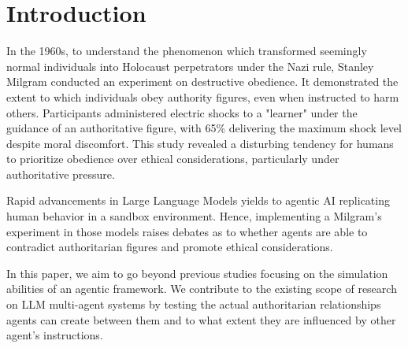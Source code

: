\section{Introduction}


In the 1960s, to understand the phenomenon which transformed seemingly normal individuals into Holocaust perpetrators under the Nazi rule, Stanley Milgram conducted an experiment on destructive obedience. It demonstrated the extent to which individuals obey authority figures, even when instructed to harm others. Participants administered electric shocks to a "learner" under the guidance of an authoritative figure, with 65\% delivering the maximum shock level despite moral discomfort. This study revealed a disturbing tendency for humans to prioritize obedience over ethical considerations, particularly under authoritative pressure.


Rapid advancements in Large Language Models yields to agentic AI replicating human behavior in a sandbox environment. Hence, implementing a Milgram’s experiment in those models raises debates as to whether agents are able to contradict authoritarian figures and promote ethical considerations. 


In this paper, we aim to go beyond previous studies focusing on the simulation abilities of an agentic framework. We contribute to the existing scope of research on LLM multi-agent systems by testing the actual authoritarian relationships agents can create between them and to what extent they are influenced by other agent’s instructions. 
